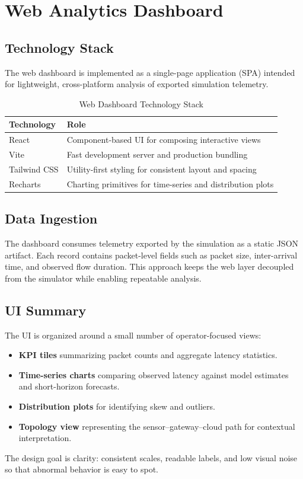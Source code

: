 \chapter{Web Analytics Dashboard}

\section{Technology Stack}

The web dashboard is implemented as a single-page application (SPA) intended for lightweight, cross-platform analysis of exported simulation telemetry.

\begin{table}[H]
\centering
\caption{Web Dashboard Technology Stack}
\label{tab:webstack}
\begin{tabularx}{\textwidth}{@{}lX@{}}
\toprule
\textbf{Technology} & \textbf{Role} \\
\midrule
React & Component-based UI for composing interactive views \\
Vite & Fast development server and production bundling \\
Tailwind CSS & Utility-first styling for consistent layout and spacing \\
Recharts & Charting primitives for time-series and distribution plots \\
\bottomrule
\end{tabularx}
\end{table}

\section{Data Ingestion}

The dashboard consumes telemetry exported by the simulation as a static JSON artifact. Each record contains packet-level fields such as packet size, inter-arrival time, and observed flow duration. This approach keeps the web layer decoupled from the simulator while enabling repeatable analysis.

\section{UI Summary}

The UI is organized around a small number of operator-focused views:
\begin{itemize}
    \item \textbf{KPI tiles} summarizing packet counts and aggregate latency statistics.
    \item \textbf{Time-series charts} comparing observed latency against model estimates and short-horizon forecasts.
    \item \textbf{Distribution plots} for identifying skew and outliers.
    \item \textbf{Topology view} representing the sensor--gateway--cloud path for contextual interpretation.
\end{itemize}

The design goal is clarity: consistent scales, readable labels, and low visual noise so that abnormal behavior is easy to spot.
